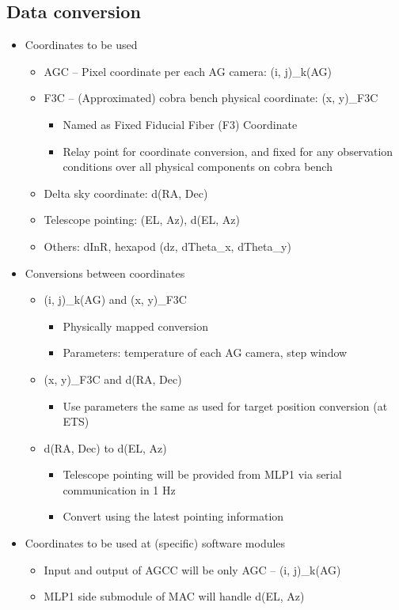 \documentclass[a4paper,notitlepage]{article}
\begin{document}
\subsection{Data conversion}

\begin{itemize}
  \item Coordinates to be used
  \begin{itemize}
    \item AGC -- Pixel coordinate per each AG camera: (i, j)\_k(AG)
    \item F3C -- (Approximated) cobra bench physical coordinate: (x, y)\_F3C
    \begin{itemize}
      \item Named as Fixed Fiducial Fiber (F3) Coordinate
      \item Relay point for coordinate conversion, and fixed for any observation conditions over all physical components on cobra bench
    \end{itemize}
    \item Delta sky coordinate: d(RA, Dec)
    \item Telescope pointing: (EL, Az), d(EL, Az)
    \item Others: dInR, hexapod (dz, dTheta\_x, dTheta\_y)
  \end{itemize}
  \item Conversions between coordinates
  \begin{itemize}
    \item (i, j)\_k(AG) and (x, y)\_F3C
    \begin{itemize}
      \item Physically mapped conversion
      \item Parameters: temperature of each AG camera, step window
    \end{itemize}
    \item (x, y)\_F3C and d(RA, Dec)
    \begin{itemize}
      \item Use parameters the same as used for target position conversion (at ETS)
    \end{itemize}
    \item d(RA, Dec) to d(EL, Az)
    \begin{itemize}
      \item Telescope pointing will be provided from MLP1 via serial communication in 1 Hz
      \item Convert using the latest pointing information
    \end{itemize}
  \end{itemize}
  \item Coordinates to be used at (specific) software modules
  \begin{itemize}
    \item Input and output of AGCC will be only AGC -- (i, j)\_k(AG)
    \item MLP1 side submodule of MAC will handle d(EL, Az)
  \end{itemize}
\end{itemize}
\end{document}
